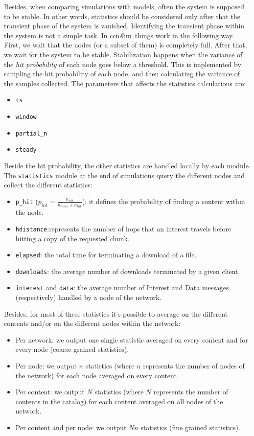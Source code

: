 \documentclass{article}
\newcommand{\ccnsim}{ccn$\mathcal{S}$im}
\begin{document}
Besides, when comparing simulations with models, often the system is supposed to be stable. In other words, statistics should be considered only after that the transient phase of the system is vanished. Identifying the transient phase within the system is not a simple task. In \ccnsim\ things work in the following way. First, we wait that the nodes (or a subset of them) is completely full. After that, we wait for the system to be stable. Stabilization happens when the variance of the \emph{hit probability} of each node goes below a threshold. This is implemented by sampling the hit probability of each node, and then calculating the variance of the samples collected.  The parameters that affects the statistics calculations are:
\begin{itemize}
    \item \verb|ts|
    \item \verb|window|
    \item \verb|partial_n|
    \item \verb|steady|
\end{itemize}
Beside the hit probability, the other statistics are handled locally by each module. The \verb|statistics| module at the end of simulations query the different nodes and collect the different statistics:
\begin{itemize}
    \item \verb|p_hit|  ($p_{hit} = \frac{n_{hit}}{n_{miss}+n_{hit}}$): it defines the probability of finding a content within the node.
    \item \verb|hdistance|:represents the number of hops that an interest travels before hitting a copy of the requested chunk.
    \item \verb|elapsed|: the total time for terminating a download of a file.
    \item \verb|downloads|: the average number of downloads terminated by a given client.
    \item \verb|interest| and \verb|data|: the average number of Interest and Data messages (respectively) handled by a node of the network. 
\end{itemize}
Besides, for most of these statistics it's possible to average on the different contents and/or on the different nodes within the network:
\begin{itemize}
    \item Per network: we output one single statistic averaged on every content and for every node (coarse grained statistics).
    \item Per node: we output $n$ statistics (where $n$ represents the number of nodes of the network) for each node averaged on every content.
    \item Per content: we output $N$ statistics (where $N$ represents the number of contents in the catalog) for each content averaged on all nodes of the network.
    \item Per content and per node: we output $Nn$ statistics (fine grained statistics). 
\end{itemize}
\end{document}
